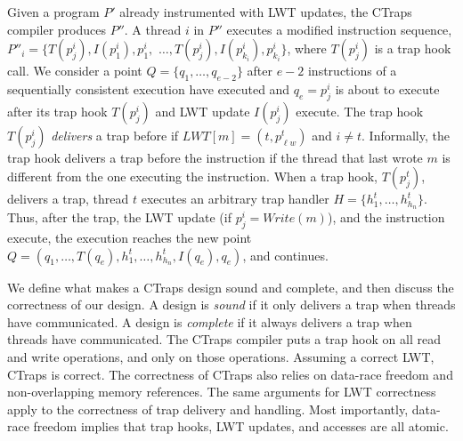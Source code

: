 \documentclass[preprint,9pt]{sigplanconf}
\newcommand{\ctraps}{CTraps\xspace}
\newcommand{\lwt}{LWT\xspace}
\begin{document}
Given a program $P'$ already instrumented with \lwt updates, the \ctraps
compiler produces $P''$. A thread $i$ in $P''$ executes a modified instruction
sequence, $P''_{i} = \{ T(p^{i}_{j}), I(p^{i}_{1}), p^{i}_{1},$ $\ldots,
T(p^{i}_{j}), I(p^{i}_{k_{i}}), p^{i}_{k_{i}} \}$, where $T(p^{i}_{j})$ is a
trap hook call.  We consider a point $Q = \{q_1, \ldots, q_{e-2}\}$ after $e-2$
instructions of a sequentially consistent execution have executed and $q_{e} =
p^{i}_{j}$ is about to execute after its trap hook $T(p^{i}_{j})$ and \lwt
update $I(p^{i}_{j})$ execute.  The trap hook $T(p^{i}_{j})$ {\em delivers} a
trap before if $LWT[m] = (t,p^{t}_{\ell w})$ and $i \ne t$.  Informally, the
trap hook delivers a trap before the instruction if the thread that last wrote
$m$ is different from the one executing the instruction.  When a trap hook,
$T(p^{t}_{j})$, delivers a trap, thread $t$ executes an arbitrary trap handler
$H = \{h^{t}_{1}, \ldots, h^{t}_{h_{n}}\}$.  Thus, after the trap, the \lwt
update (if $p^{i}_{j} = Write(m)$), and the instruction execute, the execution
reaches the new point $Q = (q_{1}, \ldots, T(q_{e}), h^{t}_{1}, \ldots,
h^{t}_{h_{n}}, I(q_{e}), q_{e})$, and continues.

We define what makes a \ctraps design sound and complete, and then discuss the
correctness of our design.  A design is {\em sound} if it only delivers a trap
when threads have communicated.  A design is {\em complete} if it always
delivers a trap when threads have communicated.  The \ctraps compiler puts a
trap hook on all read and write operations, and only on those operations.
Assuming a correct \lwt, \ctraps is correct.  The correctness of \ctraps also
relies on data-race freedom and non-overlapping memory references.  The same
arguments for \lwt correctness apply to the correctness of trap delivery and
handling.  Most importantly, data-race freedom implies that trap hooks, \lwt
updates, and accesses are all atomic.


\end{document}
